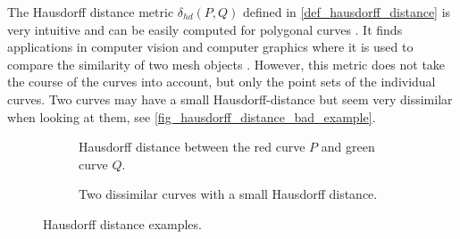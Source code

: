 \documentclass[
oneside,
fontsize=11pt
]{scrartcl}
\begin{document}
The Hausdorff distance metric $\delta_{hd}(P,Q)$ defined in \autoref{def_hausdorff_distance} 
is very intuitive and can be easily computed for polygonal curves \cite{ko_complexity_2013}.
It finds applications in computer vision and computer graphics 
where it is used to compare the similarity of two mesh objects \cite{cignoni_metro_1998,ko_complexity_2013}. 
However, this metric does not take the course of the curves into account, 
but only the point sets of the individual curves.
Two curves may have a small Hausdorff-distance but seem very dissimilar 
when looking at them, see \autoref{fig_hausdorff_distance_bad_example}.

\begin{figure}[ht]
  \centering
  \begin{subfigure}[b]{0.45\textwidth}
      \caption{Hausdorff distance between the red curve $P$ and green curve $Q$. }
      \label{fig_hausdorff_distance_example}
  \end{subfigure}
  \hfill
  \begin{subfigure}[b]{0.45\textwidth}
      \caption[Hausdorff distance of two dissimilar curves]{Two dissimilar curves with a small Hausdorff distance.}
      \label{fig_hausdorff_distance_bad_example}
  \end{subfigure}
  \caption[Hausdorff distance examples]{Hausdorff distance examples.}
  \label{fig_hausdorff_distance_examples}
\end{figure}
\end{document}
